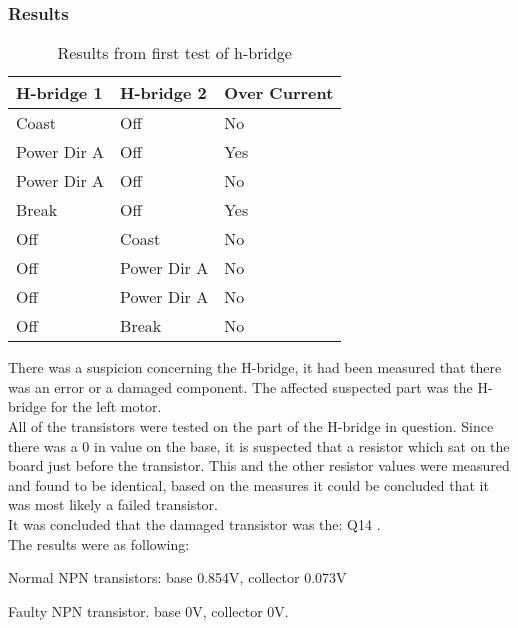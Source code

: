 \subsubsection{Results}
\begin{table}[]
\centering
\begin{tabular}{l|l|l}
\textbf{H-bridge 1} & \textbf{H-bridge 2} & \textbf{Over Current} \\ \hline
\rowcolor[HTML]{EFEFEF} 
Coast               & Off                 & No                    \\ \hline
Power Dir A         & Off                 & Yes                   \\ \hline
\rowcolor[HTML]{EFEFEF} 
Power Dir A         & Off                 & No                    \\ \hline
Break               & Off                 & Yes                   \\ \hline
\rowcolor[HTML]{EFEFEF} 
Off                 & Coast               & No                    \\ \hline
Off                 & Power Dir A         & No                    \\ \hline
\rowcolor[HTML]{EFEFEF} 
Off                 & Power Dir A         & No                    \\ \hline
Off                 & Break               & No                   
\end{tabular}
\caption{Results from first test of h-bridge}
\label{firsthbridgetest}
\end{table}
There was a suspicion concerning the H-bridge, it had been measured that there was an error or a damaged component. The affected suspected part was the H-bridge for the left motor.\\

All of the transistors were tested on the part of the H-bridge in question.
Since there was a 0 in value on the base, it is suspected that a resistor which sat on the board just before the transistor. This and the other resistor values were measured and found to be identical, based on the measures it could be concluded that it was most likely a failed transistor.\\

It was concluded that the damaged transistor was the: Q14 \cite{Q14}  
.\\

The results were as following:\

Normal NPN transistors: base 0.854V, collector 0.073V\

Faulty NPN transistor. base 0V, collector 0V.\\